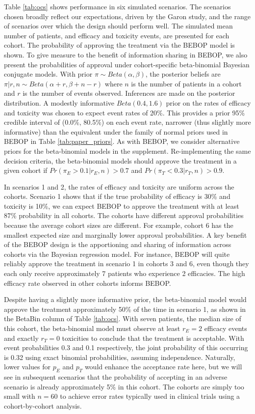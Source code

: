 \documentclass[alpha-refs]{wiley-article}
\begin{document}
Table \ref{tab:ocs} shows performance in six simulated scenarios.
The scenarios chosen broadly reflect our expectations, driven by the Garon study, and the range of scenarios over which the design should perform well.
The simulated mean number of patients, and efficacy and toxicity events, are presented for each cohort.
The probability of approving the treatment via the BEBOP model is shown.
To give measure to the benefit of information sharing in BEBOP, we also present the probabilities of approval under cohort-specific beta-binomial Bayesian conjugate models.
With prior $\pi \sim Beta(\alpha, \beta)$, the posterior beliefs are $\pi | r, n \sim Beta(\alpha + r, \beta + n - r)$ where $n$ is the number of patients in a cohort and $r$ is the number of events observed.
Inferences are made on the posterior distribution.
A modestly informative $Beta(0.4, 1.6)$ prior on the rates of efficacy and toxicity was chosen to expect event rates of 20\%.
This provides a prior 95\% credible interval of (0.0\%, 80.5\%) on each event rate, narrower (thus slightly more informative) than the equivalent under the family of normal priors used in BEBOP in Table \ref{tab:paper_priors}.
As with BEBOP, we consider alternative priors for the beta-binomial models in the supplement.
Re-implementing the same decision criteria, the beta-binomial models should approve the treatment in a given cohort if $Pr(\pi_E > 0.1 | r_E, n) > 0.7$ and $Pr(\pi_T < 0.3 | r_T, n) > 0.9$.

In scenarios 1 and 2, the rates of efficacy and toxicity are uniform across the cohorts.
Scenario 1 shows that if the true probability of efficacy is 30\% and toxicity is 10\%, we can expect BEBOP to approve the treatment with at least 87\% probability in all cohorts. 
The cohorts have different approval probabilities because the average cohort sizes are different. 
For example, cohort 6 has the smallest expected size and marginally lower approval probabilities.
A key benefit of the BEBOP design is the apportioning and sharing of information across cohorts via the Bayesian regression model.
For instance, BEBOP will quite reliably approve the treatment in scenario 1 in cohorts 3 and 6, even though they each only receive approximately 7 patients who experience 2 efficacies.
The high efficacy rate observed in other cohorts informs BEBOP.

Despite having a slightly more informative prior, the beta-binomial model would approve the treatment approximately 50\% of the time in scenario 1, as shown in the BetaBin column of Table \ref{tab:ocs}.
With seven patients, the median size of this cohort, the beta-binomial model must observe at least $r_E=2$ efficacy events and exactly $r_T=0$ toxicities to conclude that the treatment is acceptable.
With event probabilities 0.3 and 0.1 respectively, the joint probability of this occurring is 0.32 using exact binomial probabilities, assuming independence.
Naturally, lower values for $p_E$ and $p_T$ would enhance the acceptance rate here, but we will see in subsequent scenarios that the probability of accepting in an adverse scenario is already approximately 5\% in this cohort.
The cohorts are simply too small with $n=60$ to achieve error rates typically used in clinical trials using a cohort-by-cohort analysis.
\end{document}
